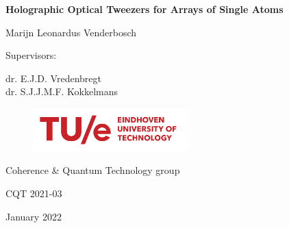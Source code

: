 \begin{titlepage}
	\begin{centering}
		\vspace*{3cm}
		
		\textsf{\LARGE \textbf{Holographic Optical Tweezers for Arrays of Single Atoms}}
		
		\vspace{2.5cm}
		
		\textsf{\Large Marijn Leonardus Venderbosch}
		
		\vspace{2cm}
		
		\textsf{\large Supervisors:}
		
		\vspace{0.5cm}
		
		\textsf{\large dr. E.J.D. Vredenbregt\\
			dr. S.J.J.M.F. Kokkelmans
			}
		
		\vfill
		
		\begin{figure}[h]
			\centering
			\includegraphics[width=6cm]{figures/TUeLogo.png}
		\end{figure}
		
		\textsf{Coherence \& Quantum Technology group}
		
		\vspace{0.4cm}	
		
		\textsf{CQT 2021-03}
		
		\textsf{January 2022}
		
		\vspace{1cm}
		
		
	\end{centering}
\end{titlepage}



